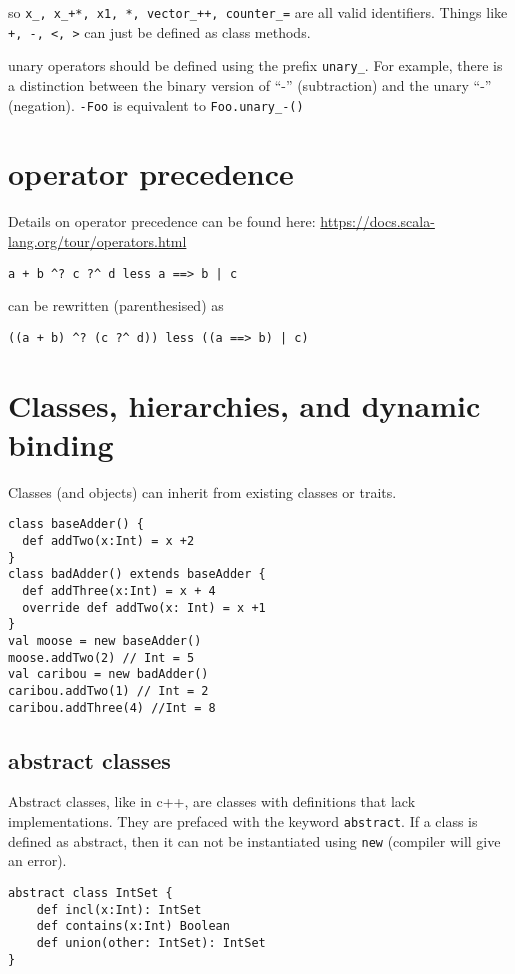 so \lstinline|x_, x_+*, x1, *, vector_++, counter_=| are all valid identifiers. Things like \lstinline|+, -, <, >| can just be defined as class methods.

unary operators should be defined using the prefix \lstinline|unary_|. For example, there is a distinction between the binary version of ``-'' (subtraction) and the unary ``-'' (negation). \lstinline|-Foo| is equivalent to \lstinline{Foo.unary_-()}

\section{operator precedence}

Details on operator precedence can be found here: \url{https://docs.scala-lang.org/tour/operators.html}

\begin{lstlisting}
a + b ^? c ?^ d less a ==> b | c
\end{lstlisting}
can be rewritten (parenthesised) as 
\begin{lstlisting}
((a + b) ^? (c ?^ d)) less ((a ==> b) | c)
\end{lstlisting}

\section{Classes, hierarchies, and dynamic binding}
Classes (and objects) can inherit from existing classes or traits. 

\begin{lstlisting}
class baseAdder() {
  def addTwo(x:Int) = x +2
}
class badAdder() extends baseAdder {
  def addThree(x:Int) = x + 4
  override def addTwo(x: Int) = x +1
}
val moose = new baseAdder()
moose.addTwo(2) // Int = 5
val caribou = new badAdder()
caribou.addTwo(1) // Int = 2
caribou.addThree(4) //Int = 8
\end{lstlisting}

\subsection{abstract classes}
Abstract classes, like in c++, are classes with definitions that lack implementations. They are prefaced with the keyword \lstinline|abstract|. If a class is defined as abstract, then it can not be instantiated using \lstinline|new| (compiler will give an error).
\begin{lstlisting}
abstract class IntSet {
    def incl(x:Int): IntSet
    def contains(x:Int) Boolean
    def union(other: IntSet): IntSet
}
\end{lstlisting}

